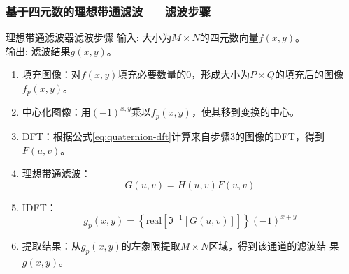 \documentclass[xcolor=svgnames,serif,table,10pt]{beamer}
\begin{document}
\begin{frame}
  \frametitle{基于四元数的理想带通滤波 --- 滤波步骤}
  \scriptsize
  \begin{exampleblock}{理想带通滤波器滤波步骤}
    \textcolor{black!60!green}{输入}: 大小为$M\times N$的四元数向量$f(x,y)$。\\
    \textcolor{black!60!green}{输出}: 滤波结果$g(x,y)$。\\ \vspace{-.5em}
    \begin{enumerate}[(S1)]
    \item 填充图像：对$f(x,y)$填充必要数量的0，形成大小为$P\times Q$的填充后的图像
    $f_{p}(x,y)$。
    \item 中心化图像：用$(-1)^{x,y}$乘以$f_{p}(x,y)$，使其移到变换的中心。
    \item DFT：根据公式\ref{eq:quaternion-dft}计算来自步骤3的图像的DFT，得到$F(u,v)$。
    \item 理想带通滤波：$$G(u,v)=H(u,v)F(u,v)$$
    \item IDFT：$$g_p(x,y)=\left\{
      \mbox{real}[\Im^{-1}[G(u,v)]] \right\}(-1)^{x+y}$$ 
    \item 提取结果：从$g_p(x,y)$的左象限提取$M\times N$区域，得到该通道的滤波结
    果$g(x,y)$。
    \end{enumerate}
  \end{exampleblock}
\end{frame}
\end{document}
